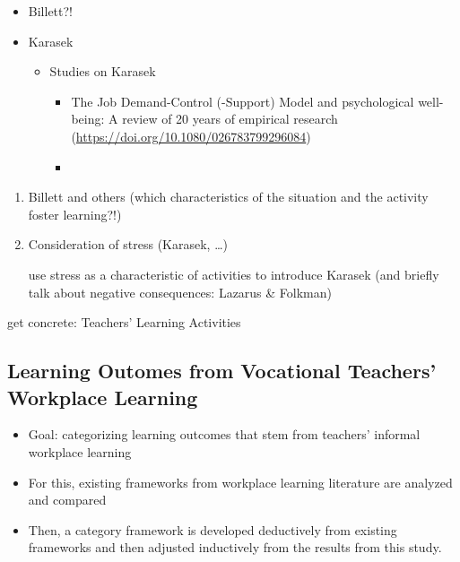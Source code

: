 \documentclass[
]{article}
\providecommand{\tightlist}{%
  \setlength{\itemsep}{0pt}\setlength{\parskip}{0pt}}
\begin{document}
\begin{itemize}
\tightlist
\item
  Billett?!
\item
  Karasek

  \begin{itemize}
  \tightlist
  \item
    Studies on Karasek

    \begin{itemize}
    \tightlist
    \item
      The Job Demand-Control (-Support) Model and psychological
      well-being: A review of 20 years of empirical research
      (\url{https://doi.org/10.1080/026783799296084})
    \item
    \end{itemize}
  \end{itemize}
\end{itemize}

\begin{enumerate}
\def\labelenumi{\arabic{enumi}.}
\item
  Billett and others (which characteristics of the situation and the
  activity foster learning?!)
\item
  Consideration of stress (Karasek, \ldots)

  use stress as a characteristic of activities to introduce Karasek (and
  briefly talk about negative consequences: Lazarus \& Folkman)
\end{enumerate}

get concrete: Teachers' Learning Activities

\subsection{Learning Outomes from Vocational Teachers' Workplace
Learning}\label{learning-outomes-from-vocational-teachers-workplace-learning}

\begin{itemize}
\tightlist
\item
  Goal: categorizing learning outcomes that stem from teachers' informal
  workplace learning
\item
  For this, existing frameworks from workplace learning literature are
  analyzed and compared
\item
  Then, a category framework is developed deductively from existing
  frameworks and then adjusted inductively from the results from this
  study.
\end{itemize}
\end{document}

